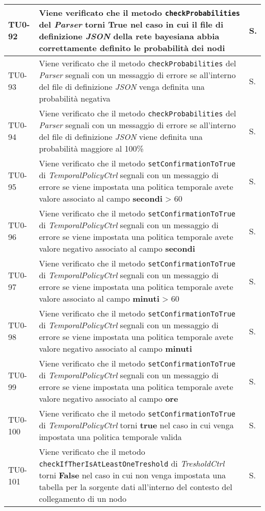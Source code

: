 \begin{longtable}{|C{.15\textwidth}|m{.66\textwidth}|C{.10\textwidth}|}
\hline
TU0-92 & Viene verificato che il metodo \texttt{checkProbabilities} del \textit{Parser} torni \textbf{True} nel caso in cui il file di definizione \textit{JSON} della rete bayesiana abbia correttamente definito le probabilità dei nodi & S.\\
\hline
{}TU0-93 & Viene verificato che il metodo \texttt{checkProbabilities} del \textit{Parser} segnali con un messaggio di errore se all'interno del file di definizione \textit{JSON} venga definita una probabilità negativa & S.\\
\hline
TU0-94 & Viene verificato che il metodo \texttt{checkProbabilities} del \textit{Parser} segnali con un messaggio di errore se all'interno del file di definizione \textit{JSON} viene definita una probabilità maggiore al 100\% & S.\\
\hline
{}TU0-95 & Viene verificato che il metodo \texttt{setConfirmationToTrue} di \textit{TemporalPolicyCtrl} segnali con un messaggio di errore se viene impostata una politica temporale avete valore associato al campo \textbf{secondi} > 60 & S.\\
\hline
TU0-96 & Viene verificato che il metodo \texttt{setConfirmationToTrue} di \textit{TemporalPolicyCtrl} segnali con un messaggio di errore se viene impostata una politica temporale avete valore negativo associato al campo \textbf{secondi} & S.\\
\hline
{}TU0-97 & Viene verificato che il metodo \texttt{setConfirmationToTrue} di \textit{TemporalPolicyCtrl} segnali con un messaggio di errore se viene impostata una politica temporale avete valore associato al campo \textbf{minuti} > 60 & S.\\
\hline
TU0-98 & Viene verificato che il metodo \texttt{setConfirmationToTrue} di \textit{TemporalPolicyCtrl} segnali con un messaggio di errore se viene impostata una politica temporale avete valore negativo associato al campo \textbf{minuti} & S.\\
\hline
{}TU0-99 & Viene verificato che il metodo \texttt{setConfirmationToTrue} di \textit{TemporalPolicyCtrl} segnali con un messaggio di errore se viene impostata una politica temporale avete valore negativo associato al campo \textbf{ore} & S.\\
\hline
TU0-100 & Viene verificato che il metodo \texttt{setConfirmationToTrue} di \textit{TemporalPolicyCtrl} torni \textbf{true} nel caso in cui venga impostata una politica temporale valida & S.\\
\hline
{}TU0-101 & Viene verificato che il metodo \texttt{checkIfTherIsAtLeastOneTreshold} di \textit{TresholdCtrl} torni \textbf{False} nel caso in cui non venga impostata una tabella per la sorgente dati all'interno del contesto del collegamento di un nodo & S.\\

\end{longtable}
